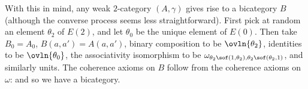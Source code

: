 With this in mind, any weak $2$-category $(A,\gamma)$ gives rise to a
bicategory $B$ (although the converse process seems less straightforward).
First pick at random an element $\theta_2$ of $E(2)$, and let $\theta_0$ be
the unique element of $E(0)$.  Then take $B_0 = A_0$, $B(a,a')=A(a,a')$,
binary composition to be $\ovln{\theta_2}$, identities to be
$\ovln{\theta_0}$, the associativity isomorphism to be $\omega_{\theta_2\sof
(1,\theta_2), \theta_2\sof (\theta_2,1)}$, and similarly units.  The coherence
axioms on $B$ follow from the coherence axioms on $\omega$: and so we have
a bicategory.


\clearpage

